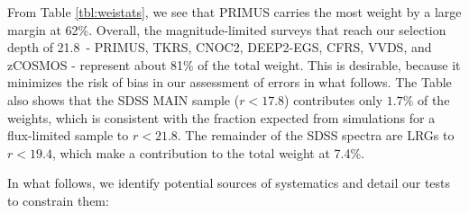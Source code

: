 \documentclass[12pt,preprint]{aastex}
\newcommand{\rmax}{21.8}
\begin{document}
From Table \ref{tbl:weistats}, we see that PRIMUS carries the most weight by a
large margin at 62\%.  Overall, the magnitude-limited surveys that reach our
selection depth of \rmax\ - PRIMUS, TKRS, CNOC2, DEEP2-EGS, CFRS, VVDS, and
zCOSMOS - represent about 81$\%$ of the total weight.  
This is desirable,
because it minimizes the risk of bias in our assessment of errors in what follows.
The Table also shows that the SDSS MAIN sample ($r<17.8$) contributes only $1.7\%$ of the weights, which
is consistent with the fraction expected from simulations for a flux-limited sample 
to $r<21.8$.
The remainder of the SDSS spectra are LRGs to $r<19.4$, which make a 
contribution to the total weight at 7.4\%.

In what follows, we identify potential sources of systematics and detail our
tests to constrain them:
\end{document}
